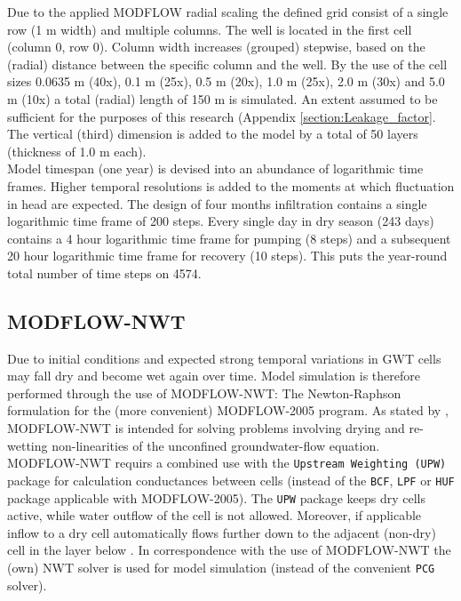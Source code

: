 Due to the applied MODFLOW radial scaling the defined grid consist of a single row (1 m width) and multiple columns. The well is located in the first cell (column 0, row 0). Column width increases (grouped) stepwise, based on the (radial) distance between the specific column and the well. By the use of the cell sizes 0.0635 m (40x), 0.1 m (25x), 0.5 m (20x), 1.0 m (25x), 2.0 m (30x) and 5.0 m (10x) a total (radial) length of 150 m is simulated. An extent assumed to be sufficient for the purposes of this research (Appendix \ref{section:Leakage_factor}. The vertical (third) dimension is added to the model by a total of 50 layers (thickness of 1.0 m each). \\

Model timespan (one year) is devised into an abundance of logarithmic time frames. Higher temporal resolutions is added to the moments at which fluctuation in head are expected. The design of four months infiltration contains a single logarithmic time frame of 200 steps. Every single day in dry season (243 days) contains a 4 hour logarithmic time frame for pumping (8 steps) and a subsequent 20 hour logarithmic time frame for recovery (10 steps). This puts the year-round total number of time steps on 4574. 

\subsection{MODFLOW-NWT} 
Due to initial conditions and expected strong temporal variations in GWT cells may fall dry and become wet again over time. Model simulation is therefore performed through the use of MODFLOW-NWT: The Newton-Raphson formulation for the (more convenient) MODFLOW-2005 program. As stated by \citet{Niswonger2011}, MODFLOW-NWT is intended for solving problems involving drying and re-wetting non-linearities of the unconfined groundwater-flow equation. MODFLOW-NWT requirs a combined use with the \texttt{Upstream Weighting (UPW)} package for calculation conductances between cells (instead of the \texttt{BCF}, \texttt{LPF} or \texttt{HUF} package applicable with MODFLOW-2005). The \texttt{UPW} package keeps dry cells active, while water outflow of the cell is not allowed. Moreover, if applicable inflow to a dry cell automatically flows further down to the adjacent (non-dry) cell in the layer below \citep{Niswonger2011}. In correspondence with the use of MODFLOW-NWT the (own) NWT solver is used for model simulation (instead of the convenient \texttt{PCG} solver). 

